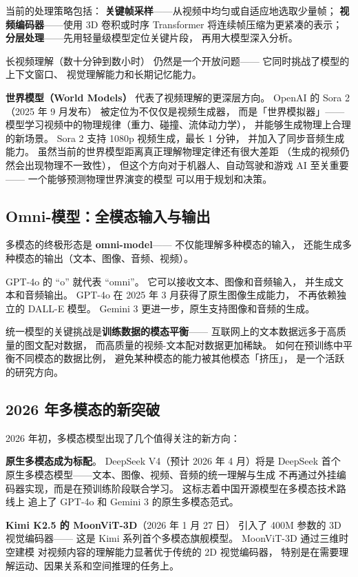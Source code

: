 当前的处理策略包括：
\textbf{关键帧采样}——从视频中均匀或自适应地选取少量帧；
\textbf{视频编码器}——使用 3D 卷积或时序 Transformer
将连续帧压缩为更紧凑的表示；
\textbf{分层处理}——先用轻量级模型定位关键片段，
再用大模型深入分析。

长视频理解（数十分钟到数小时）
仍然是一个开放问题——
它同时挑战了模型的上下文窗口、
视觉理解能力和长期记忆能力。

\textbf{世界模型（World Models）}
代表了视频理解的更深层方向。
OpenAI 的 Sora 2（2025 年 9 月发布）
被定位为不仅仅是视频生成器，
而是「世界模拟器」——
模型学习视频中的物理规律（重力、碰撞、流体动力学），
并能够生成物理上合理的新场景。
Sora 2 支持 1080p 视频生成，最长 1 分钟，
并加入了同步音频生成能力。
虽然当前的世界模型距离真正理解物理定律还有很大差距
（生成的视频仍然会出现物理不一致性），
但这个方向对于机器人、自动驾驶和游戏 AI 至关重要——
一个能够预测物理世界演变的模型
可以用于规划和决策。

\subsection{Omni-模型：全模态输入与输出}

多模态的终极形态是 \textbf{omni-model}——
不仅能理解多种模态的输入，
还能生成多种模态的输出（文本、图像、音频、视频）。

GPT-4o 的 ``o'' 就代表 ``omni''。
它可以接收文本、图像和音频输入，
并生成文本和音频输出。
GPT-4o 在 2025 年 3 月获得了原生图像生成能力，
不再依赖独立的 DALL-E 模型。
Gemini 3 更进一步，原生支持图像和音频的生成。

统一模型的关键挑战是\textbf{训练数据的模态平衡}——
互联网上的文本数据远多于高质量的图文配对数据，
而高质量的视频-文本配对数据更加稀缺。
如何在预训练中平衡不同模态的数据比例，
避免某种模态的能力被其他模态「挤压」，
是一个活跃的研究方向。

\subsection{2026 年多模态的新突破}

2026 年初，多模态模型出现了几个值得关注的新方向：

\textbf{原生多模态成为标配}。
DeepSeek V4（预计 2026 年 4 月）将是 DeepSeek 首个
原生多模态模型——文本、图像、视频、音频的统一理解与生成
不再通过外挂编码器实现，而是在预训练阶段联合学习。
这标志着中国开源模型在多模态技术路线上
追上了 GPT-4o 和 Gemini 3 的原生多模态范式。

\textbf{Kimi K2.5 的 MoonViT-3D}（2026 年 1 月 27 日）
引入了 400M 参数的 3D 视觉编码器——
这是 Kimi 系列首个多模态旗舰模型。
MoonViT-3D 通过三维时空建模
对视频内容的理解能力显著优于传统的 2D 视觉编码器，
特别是在需要理解运动、因果关系和空间推理的任务上。

